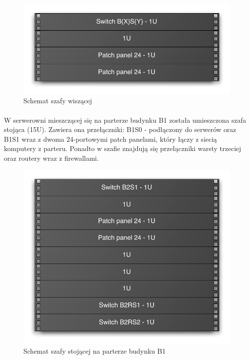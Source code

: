 \begin{figure}[H]
  \begin{center}
    \includegraphics[width=\textwidth]{img/s/szafa-mala.pdf}
    \caption{Schemat szafy wiszącej}
  \end{center}
\end{figure}

\paragraph{}
W serwerowni mieszczącej się na parterze budynku B1 została umieszczona szafa stojąca (15U).
Zawiera ona przełączniki: B1S0 - podłączony do serwerów oraz B1S1 wraz z dwoma 24-portowymi patch panelami, który łączy z siecią komputery z parteru.
Ponadto w szafie znajdują się przełączniki warsty trzeciej oraz routery wraz z firewallami.


\begin{figure}[H]
  \begin{center}
    \includegraphics[width=\textwidth]{img/s/szafa-b1.pdf}
    \caption{Schemat szafy stojącej na parterze budynku B1}
  \end{center}
\end{figure}


